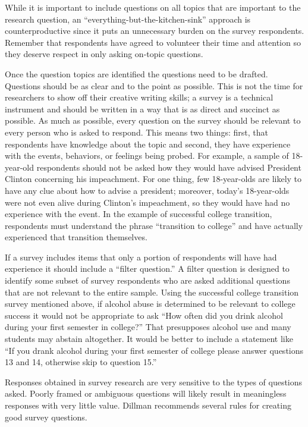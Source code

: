 While it is important to include questions on all topics that are important to the research question, an ``everything-but-the-kitchen-sink'' approach is counterproductive since it puts an unnecessary burden on the survey respondents. Remember that respondents have agreed to volunteer their time and attention so they deserve respect in only asking on-topic questions.

Once the question topics are identified the questions need to be drafted. Questions should be as clear and to the point as possible. This is not the time for researchers to show off their creative writing skills; a survey is a technical instrument and should be written in a way that is as direct and succinct as possible. As much as possible, every question on the survey should be relevant to every person who is asked to respond. This means two things: first, that respondents have knowledge about the topic and second, they have experience with the events, behaviors, or feelings being probed. For example, a sample of 18-year-old respondents should not be asked how they would have advised President Clinton concerning his impeachment. For one thing, few 18-year-olds are likely to have any clue about how to advise a president; moreover, today's 18-year-olds were not even alive during Clinton's impeachment, so they would have had no experience with the event. In the example of successful college transition, respondents must understand the phrase ``transition to college'' and have actually experienced that transition themselves.

If a survey includes items that only a portion of respondents will have had experience it should include a ``filter question.'' A filter question is designed to identify some subset of survey respondents who are asked additional questions that are not relevant to the entire sample. Using the successful college transition survey mentioned above, if alcohol abuse is determined to be relevant to college success it would not be appropriate to ask ``How often did you drink alcohol during your first semester in college?'' That presupposes alcohol use and many students may abstain altogether. It would be better to include a statement like ``If you drank alcohol during your first semester of college please answer questions 13 and 14, otherwise skip to question 15.''

Responses obtained in survey research are very sensitive to the types of questions asked. Poorly framed or ambiguous questions will likely result in meaningless responses with very little value. Dillman\cite{dillman2011mail} recommends several rules for creating good survey questions.

